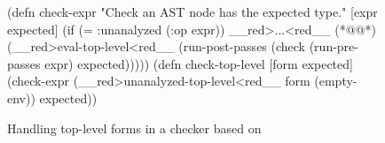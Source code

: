 \begin{figure}
\lstset{numbers=left,xleftmargin=2em,framexleftmargin=1.5em}
\begin{cljlisting}
(defn check-expr
  "Check an AST node has the expected type."
  [expr expected]
  (if (= :unanalyzed (:op expr))
    __red>...<red__ (*@\label{analyzer:listing:cta-top-level-driver:unanalyzed-cases}@*)
    (__red>eval-top-level<red__
      (run-post-passes
        (check (run-pre-passes expr)
               expected)))))
(defn check-top-level [form expected]
  (check-expr (__red>unanalyzed-top-level<red__ form (empty-env))
              expected))
\end{cljlisting}
  \caption{Handling top-level forms in a checker based on }
  \label{fig:analyzer:core.typed.analyzer-top-level-driver}
\end{figure}
